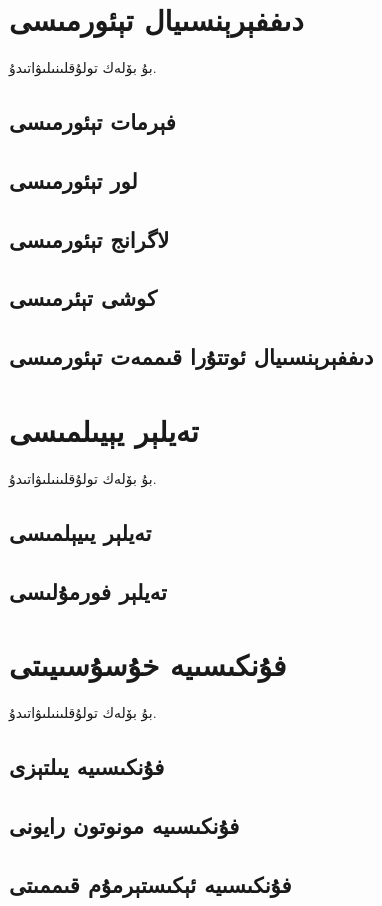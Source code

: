 \section{دىففېرېنسىيال تېئورمىسى}
بۇ بۆلەك تولۇقلىنىلىۋاتىدۇ.
\subsection{فېرمات تېئورمىسى}
\subsection{لور تېئورمىسى}
\subsection{لاگرانج تېئورمىسى}
\subsection{كوشى تېئرمىسى}
\subsection{دىففېرېنسىيال ئوتتۇرا قىممەت تېئورمىسى}

\section{تەيلېر يېيىلمىسى}
بۇ بۆلەك تولۇقلىنىلىۋاتىدۇ.
\subsection{تەيلېر يىيېلمىسى}
\subsection{تەيلېر فورمۇلىسى}

\section{فۇنكىسىيە خۇسۇسىيىتى}
بۇ بۆلەك تولۇقلىنىلىۋاتىدۇ.
\subsection{فۇنكىسىيە يىلتېزى}
\subsection{فۇنكىسىيە مونوتون رايونى}
\subsection{فۇنكىسىيە ئېكىستېرمۇم قىممىتى}

